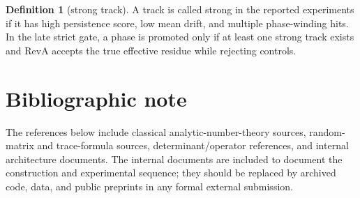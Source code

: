 \documentclass[11pt]{article}
\theoremstyle{definition}
\newtheorem{definition}{Definition}
\theoremstyle{plain}
\begin{document}
\begin{definition}[strong track]
A track is called strong in the reported experiments if it has high persistence score, low mean drift, and multiple phase-winding hits.  In the late strict gate, a phase is promoted only if at least one strong track exists and RevA accepts the true effective residue while rejecting controls.
\end{definition}

\section{Bibliographic note}

The references below include classical analytic-number-theory sources, random-matrix and trace-formula sources, determinant/operator references, and internal architecture documents.  The internal documents are included to document the construction and experimental sequence; they should be replaced by archived code, data, and public preprints in any formal external submission.



\end{document}
